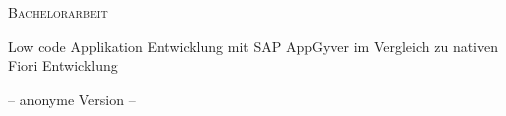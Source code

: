 

\begin{titlepage}

\begin{center}
  \huge\scshape Bachelorarbeit
\end{center}

\vspace{2cm}

\begin{center}
\huge\sffamily Low code Applikation Entwicklung mit SAP AppGyver im Vergleich zu nativen Fiori Entwicklung
\end{center}

\vspace{2cm}

\begin{center}
  \Large -- anonyme Version --
\end{center}


\end{titlepage}

\restoregeometry
